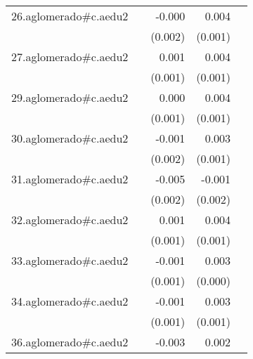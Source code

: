 {\begin{longtable}{l*{4}{D{.}{.}{-1}}}
\addlinespace
26.aglomerado#c.aedu2&                     &      -0.000         &       0.004\sym{**} &                     \\
            &                     &     (0.002)         &     (0.001)         &                     \\
\addlinespace
27.aglomerado#c.aedu2&                     &       0.001         &       0.004\sym{***}&                     \\
            &                     &     (0.001)         &     (0.001)         &                     \\
\addlinespace
29.aglomerado#c.aedu2&                     &       0.000         &       0.004\sym{***}&                     \\
            &                     &     (0.001)         &     (0.001)         &                     \\
\addlinespace
30.aglomerado#c.aedu2&                     &      -0.001         &       0.003\sym{*}  &                     \\
            &                     &     (0.002)         &     (0.001)         &                     \\
\addlinespace
31.aglomerado#c.aedu2&                     &      -0.005\sym{**} &      -0.001         &                     \\
            &                     &     (0.002)         &     (0.002)         &                     \\
\addlinespace
32.aglomerado#c.aedu2&                     &       0.001         &       0.004\sym{***}&                     \\
            &                     &     (0.001)         &     (0.001)         &                     \\
\addlinespace
33.aglomerado#c.aedu2&                     &      -0.001         &       0.003\sym{***}&                     \\
            &                     &     (0.001)         &     (0.000)         &                     \\
\addlinespace
34.aglomerado#c.aedu2&                     &      -0.001         &       0.003\sym{***}&                     \\
            &                     &     (0.001)         &     (0.001)         &                     \\
\addlinespace
36.aglomerado#c.aedu2&                     &      -0.003         &       0.002         &                     \\

\end{longtable}}
